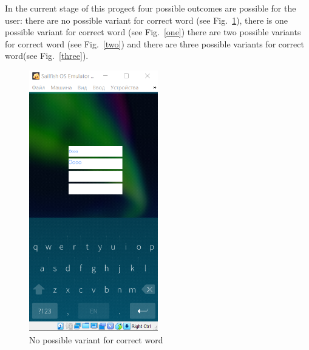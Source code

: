 \documentclass[conference]{IEEEtran}
\begin{document}
In the current stage of this progect four possible outcomes are possible for the user: there are no possible variant for correct word (see Fig.~\ref{zero}), there is one possible variant for correct word (see Fig.~\ref{one}) there are two possible variants for correct word (see Fig.~\ref{two}) and there are three possible variants for correct word(see Fig.~\ref{three}). 

\begin{figure}[!hbt]
	\centering
 	\includegraphics[width=0.5\textwidth]{images/0.png}
	\caption{No possible variant for correct word}
	\label{zero}
\end{figure}
\end{document}
